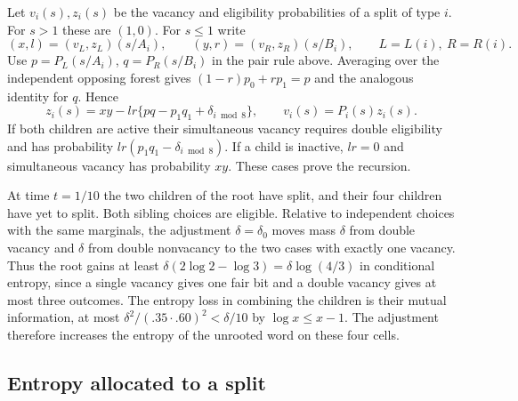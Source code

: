 \documentclass[11pt]{article}
\numberwithin{equation}{section}
\begin{document}
Let $v_i(s),z_i(s)$ be the vacancy and eligibility probabilities of
a split of type $i$. For $s>1$ these are $(1,0)$. For $s\le1$ write
\[
 (x,l)=(v_L,z_L)(s/A_i),\qquad(y,r)=(v_R,z_R)(s/B_i),
 \qquad L=L(i),\ R=R(i).
\]
Use $p=P_L(s/A_i)$, $q=P_R(s/B_i)$ in the pair rule above. Averaging
over the independent opposing forest gives $(1-r)p_0+rp_1=p$ and
the analogous identity for $q$. Hence
\begin{equation}
 z_i(s)=xy-lr\{pq-p_1q_1+\delta_{i\bmod8}\},\qquad
 v_i(s)=P_i(s)z_i(s).
 \label{nl:vacancy}
\end{equation}
If both children are active their simultaneous vacancy requires
double eligibility and has probability $lr(p_1q_1-\delta_{i\bmod8})$.
If a child is inactive, $lr=0$ and simultaneous vacancy has
probability $xy$. These cases prove the recursion.

At time $t=1/10$ the two children of the root have split, and
their four children have yet to split. Both sibling choices are
eligible. Relative to independent choices with the same marginals,
the adjustment $\delta=\delta_0$ moves mass $\delta$ from double
vacancy and $\delta$ from double nonvacancy to the two cases
with exactly one vacancy. Thus the root gains at least
$\delta(2\log2-\log3)=\delta\log(4/3)$ in conditional entropy,
since a single vacancy gives one fair bit and a double vacancy
gives at most three outcomes. The entropy loss in combining the
children is their mutual information, at most $\delta^2/(.35\cdot.60)^2<\delta/10$ by
$\log x\le x-1$.
The adjustment therefore increases the entropy of the unrooted
word on these four cells.

\subsection{Entropy allocated to a split}
\end{document}
